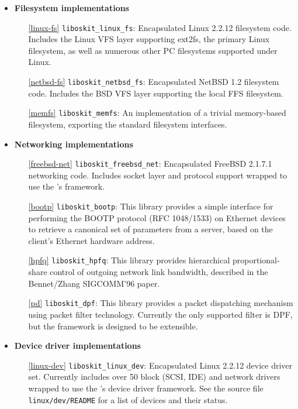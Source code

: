 \begin{itemize}
\item {\bf Filesystem implementations}
\begin{itemize}
\item[\ref{linux-fs}]	{\tt liboskit_linux_fs}:
	Encapsulated Linux 2.2.12 filesystem code.
	Includes the Linux VFS layer supporting
	ext2fs, the primary Linux filesystem,
	as well as numerous other PC filesystems supported under Linux.

\item[\ref{netbsd-fs}]	{\tt liboskit_netbsd_fs}:
	Encapsulated NetBSD 1.2 filesystem code.
	Includes the BSD VFS layer supporting the local FFS
	filesystem.

\item[\ref{memfs}]	{\tt liboskit_memfs}:
	An implementation of a trivial memory-based filesystem, exporting
	the standard \oskit{} filesystem interfaces.
\end{itemize}


\item {\bf Networking implementations}
\begin{itemize}
\item[\ref{freebsd-net}]	{\tt liboskit_freebsd_net}:
	Encapsulated FreeBSD 2.1.7.1 networking code.
	Includes socket layer and protocol support
	wrapped to use the \oskit's framework.

\item[\ref{bootp}]	{\tt liboskit_bootp}:
	This library provides a simple interface for performing the BOOTP
	protocol (RFC 1048/1533) on Ethernet devices to retrieve a
	canonical set of parameters from a server, based on the client's
	Ethernet hardware address.

\item[\ref{hpfq}]	{\tt liboskit_hpfq}:
	This library provides hierarchical proportional-share control
	of outgoing network link bandwidth, described in the Bennet/Zhang
	SIGCOMM'96 paper.

\item[\ref{pd}]		{\tt liboskit_dpf}:
	This library provides a packet dispatching mechanism using
	packet filter technology.  Currently the only supported filter
	is DPF, but the framework is designed to be extensible.
\end{itemize}


\item {\bf Device driver implementations}
\begin{itemize}
\item[\ref{linux-dev}]	{\tt liboskit_linux_dev}:
	Encapsulated Linux 2.2.12 device driver set.
	Currently includes over 50 block (SCSI, IDE) and network drivers
	wrapped to use the \oskit's device driver framework.
	See the source file \texttt{linux/dev/README} for a list of devices and
	their status.


\end{itemize}
\end{itemize}
